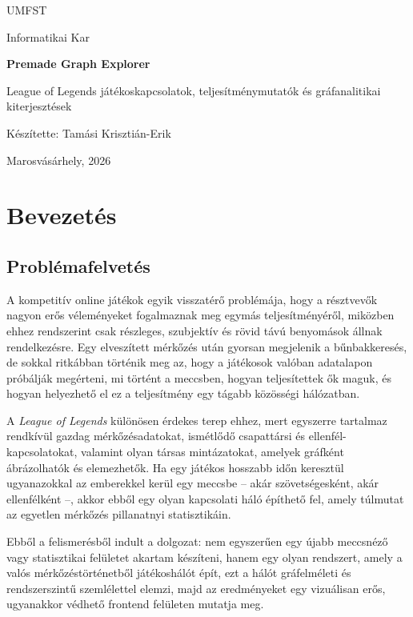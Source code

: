 ﻿\documentclass[a4paper,12pt]{report}
\begin{document}
\begin{titlepage}
    \centering
    {\LARGE UMFST \par}
    \vspace{1.2cm}
    {\Large Informatikai Kar \par}
    \vspace{3.3cm}
    {\huge\bfseries Premade Graph Explorer\par}
    \vspace{0.5cm}
    {\Large League of Legends játékoskapcsolatok, teljesítménymutatók és gráfanalitikai kiterjesztések\par}
    \vfill
    {\Large Készítette: Tamási Krisztián-Erik\par}
    \vspace{2.3cm}
    {\large Marosvásárhely, 2026\par}
\end{titlepage}

\tableofcontents
\clearpage

\chapter{Bevezetés}

\section{Problémafelvetés}

A kompetitív online játékok egyik visszatérő problémája, hogy a résztvevők nagyon erős véleményeket fogalmaznak meg egymás teljesítményéről, miközben ehhez rendszerint csak részleges, szubjektív és rövid távú benyomások állnak rendelkezésre. Egy elveszített mérkőzés után gyorsan megjelenik a bűnbakkeresés, de sokkal ritkábban történik meg az, hogy a játékosok valóban adatalapon próbálják megérteni, mi történt a meccsben, hogyan teljesítettek ők maguk, és hogyan helyezhető el ez a teljesítmény egy tágabb közösségi hálózatban.

A \emph{League of Legends} különösen érdekes terep ehhez, mert egyszerre tartalmaz rendkívül gazdag mérkőzésadatokat, ismétlődő csapattársi és ellenfél-kapcsolatokat, valamint olyan társas mintázatokat, amelyek gráfként ábrázolhatók és elemezhetők. Ha egy játékos hosszabb időn keresztül ugyanazokkal az emberekkel kerül egy meccsbe -- akár szövetségesként, akár ellenfélként --, akkor ebből egy olyan kapcsolati háló építhető fel, amely túlmutat az egyetlen mérkőzés pillanatnyi statisztikáin.

Ebből a felismerésből indult a dolgozat: nem egyszerűen egy újabb meccsnéző vagy statisztikai felületet akartam készíteni, hanem egy olyan rendszert, amely a valós mérkőzéstörténetből játékoshálót épít, ezt a hálót gráfelméleti és rendszerszintű szemlélettel elemzi, majd az eredményeket egy vizuálisan erős, ugyanakkor védhető frontend felületen mutatja meg.
\end{document}
